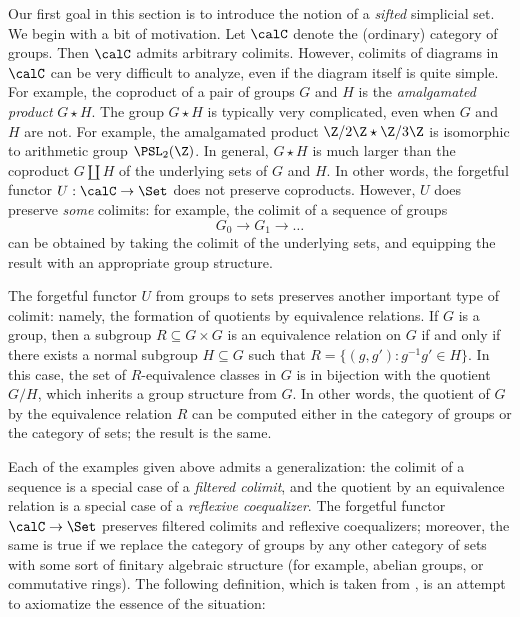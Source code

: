 Our first goal in this section is to introduce the notion of a {\em sifted} simplicial set. We begin with a bit of motivation. Let $\calC$ denote the (ordinary) category of groups. Then $\calC$ admits arbitrary colimits. However, colimits of diagrams in $\calC$ can be very difficult to analyze, even if the diagram itself is quite simple. For example, the coproduct of a pair of groups $G$ and $H$ is the {\it amalgamated product} $G \star H$. The group $G \star H$ is typically very complicated, even when $G$ and $H$ are not. For example, the amalgamated product
$\Z / 2 \Z \star \Z / 3 \Z$ is isomorphic to arithmetic group $\PSL_2(\Z)$. 
In general, $G \star H$ is much larger than the coproduct
$G \coprod H$ of the underlying sets of $G$ and $H$. In other words, the forgetful functor $U: \calC \rightarrow \Set$ does not preserve coproducts. However, $U$ does preserve {\em some} colimits: for example, the colimit of a sequence of groups
$$ G_0 \rightarrow G_1 \rightarrow \ldots $$
can be obtained by taking the colimit of the underlying sets, and equipping the result with an appropriate group structure.

The forgetful functor $U$ from groups to sets preserves another important type of colimit: namely, the formation of quotients by equivalence relations. If $G$ is a group, then a subgroup
$R \subseteq G \times G$ is an equivalence relation on $G$ if and only if there exists
a normal subgroup $H \subseteq G$ such that $R = \{ (g,g'): g^{-1} g' \in H \}$. In this case,
the set of $R$-equivalence classes in $G$ is in bijection with the quotient $G/H$, which inherits a group structure from $G$. In other words, the quotient of $G$ by the equivalence relation $R$ can be computed either in the category of groups or the category of sets; the result is the same.

Each of the examples given above admits a generalization: the colimit of a sequence is a special case of a {\it filtered colimit}, and the quotient by an equivalence relation is a special case of a {\it reflexive coequalizer}. The forgetful functor $\calC \rightarrow \Set$ preserves filtered colimits and reflexive coequalizers; moreover, the same is true if we replace the category of groups by any other category of sets with some sort of finitary algebraic structure (for example, abelian groups, or commutative rings). The following definition, which is taken from \cite{homotopyvarieties}, is an attempt to axiomatize the essence of the situation:

